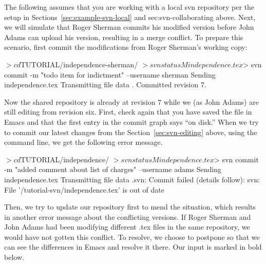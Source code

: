 The following assumes that you are working with a local svn repository per the setup in Sections~\ref{sec:example-svn-local} and {sec:svn-collaborating} above.  Next, we will simulate that Roger Sherman commits his modified version before John Adams can upload his version, resulting in a merge conflict.  To prepare this scenario, first commit the modifications from Roger Sherman's working copy:
\begin{CodeVerbatim}[commandchars=\\\{\}]
$> cd $TUTORIAL/independence-sherman/
$> svn status
M       independence.tex
$> svn commit -m "todo item for indictment" --username sherman 
Sending        independence.tex
Transmitting file data .
Committed revision 7.
\end{CodeVerbatim}

Now the shared repository is already at revision 7 while we (as John Adams) are still editing from revision six.  First, check again that you have saved the file in Emacs and that the first entry in the commit graph says ``on disk.'' When we try to commit our latest changes from the Section~\ref{sec:svn-editing} above, using the command line, we get the following error message.  
\begin{CodeVerbatim}[commandchars=\\\{\}]
$> cd $TUTORIAL/independence/
$> svn status
M       independence.tex
$> svn commit -m "added comment about list of charges" --username adams
Sending        independence.tex
Transmitting file data .svn: Commit failed (details follow):
svn: File '/tutorial-svn/independence.tex' is out of date
\end{CodeVerbatim}

Then, we try to update our repository first to mend the situation, which results in another error message about the conflicting versions.  If Roger Sherman and John Adams had been modifying different .tex files in the same repository, we would have not gotten this conflict.  To resolve, we choose to postpone so that we can see the differences in Emacs and resolve it there.  Our input is marked in bold below.

